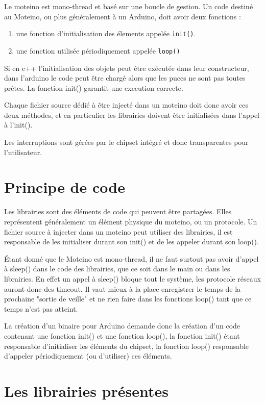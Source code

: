 \documentclass[a4paper]{report}
\begin{document}
Le moteino est mono-thread et basé sur une boucle de gestion. Un code destiné au Moteino, ou plus généralement à un Arduino, doit avoir deux fonctions :
\begin{enumerate}
\item une fonction d'initialisation des élements appelée \verb+init()+.
\item une fonction utilisée périodiquement appelée \verb+loop()+
\end{enumerate}
Si en c++ l'initialisation des objets peut être exécutée dans leur constructeur, dans l'arduino le code peut être chargé alors que les puces ne sont pas toutes prêtes. La fonction init() garantit une execution correcte.

Chaque fichier source dédié à être injecté dans un moteino doit donc avoir ces deux méthodes, et en particulier les librairies doivent être initialisées dans l'appel à l'init().

Les interruptions sont gérées par le chipset intégré et donc transparentes pour l'utilisateur.

\section{Principe de code}

Les librairies sont des éléments de code qui peuvent être partagées. Elles représentent généralement un élément physique du moteino, ou un protocole.
Un fichier source à injecter dans un moteino peut utiliser des librairies, il est responsable de les initialiser durant son init() et de les appeler durant son loop().

Étant donné que le Moteino est mono-thread, il ne faut surtout pas avoir d'appel à sleep() dans le code des librairies, que ce soit dans le main ou dans les librairies. En effet un appel à sleep() bloque tout le système, les protocole réseaux auront donc des timeout. Il vaut mieux à la place enregistrer le temps de la prochaine "sortie de veille" et ne rien faire dans les fonctions loop() tant que ce temps n'est pas atteint.

La création d'un binaire pour Arduino demande donc la création d'un code contenant une fonction init() et une fonction loop(), la fonction init() étant responsable d'initialiser les éléments du chipset, la fonction loop() responsable d'appeler périodiquement (ou d'utiliser) ces éléments.

\section{Les librairies présentes}
\end{document}
